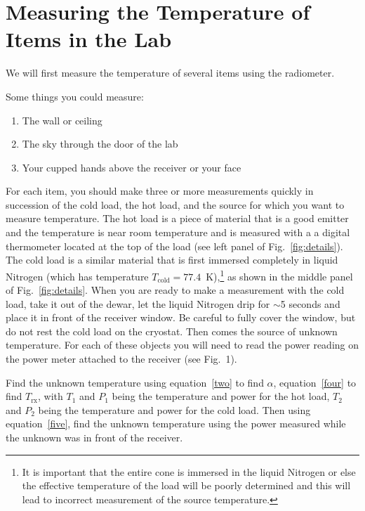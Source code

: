 \section{Measuring the Temperature of Items in the Lab}

We will first measure the temperature of several items using the radiometer. 

Some things you could measure: 
\begin{enumerate}
	\item The wall or ceiling
	\item The sky through the door of the lab
	\item Your cupped hands above the receiver or your face
\end{enumerate}

For each item, you should make three or more measurements quickly in succession of the cold load, the hot load, and the source for which you want to measure temperature. The hot load is a piece of material that is a good emitter and the temperature is near room temperature and is measured with a a digital thermometer located at the top of the load (see left panel of Fig.~\ref{fig:details}). The cold load is a similar material that is first immersed completely in liquid Nitrogen (which has temperature $T_\textrm{cold}=77.4$~K),\footnote{It is important that the entire cone is immersed in the liquid Nitrogen or else the effective temperature of the load will be poorly determined and this will lead to incorrect measurement of the source temperature.} as shown in the middle panel of Fig.~\ref{fig:details}. When you are ready to make a measurement with the cold load, take it out of the dewar, let the liquid Nitrogen drip for $\sim$5 seconds and place it in front of the receiver window. Be careful to fully cover the window, but do not rest the cold load on the cryostat. Then comes the source of unknown temperature. For each of these objects you will need to read the power reading on the power meter attached to the receiver (see Fig.~1).

Find the unknown temperature using equation~\ref{two} to find $\alpha$, equation~\ref{four} to find $T_\textrm{rx}$, with $T_1$ and $P_1$ being the temperature and power for the hot load, $T_2$ and $P_2$ being the temperature and power for the cold load. Then using equation~\ref{five}, find the unknown temperature using the power measured while the unknown was in front of the receiver.

